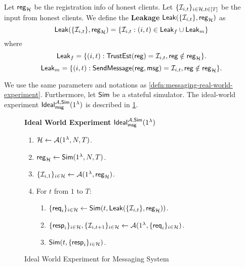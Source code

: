 \begin{definition}
\label{defn:messaging-leakage}
Let $\mathsf{reg}_{\mathcal{H}}$ be the registration info of honest clients. Let $\{\mathcal{I}_{i, t}\}_{i \in \mathcal{H}, t \in [T]}$ be the input from honest clients. We define the \textbf{Leakage} $\mathsf{Leak}(\{\mathcal{I}_{i, t}\}, \mathsf{reg}_{\mathcal{H}})$ as
$$\mathsf{Leak}(\{\mathcal{I}_{i, t}\}, \mathsf{reg}_{\mathcal{H}}) = \{\mathcal{I}_{i, t}: (i, t) \in \mathsf{Leak}_f \cup \mathsf{Leak}_m\}$$
where
$$\mathsf{Leak}_f = \{(i, t): \mathsf{TrustEst}(\mathsf{reg}) = \mathcal{I}_{i, t}, \mathsf{reg} \notin \mathsf{reg}_{\mathcal{H}}\}.$$
$$\mathsf{Leak}_m = \{(i, t): \mathsf{SendMessage}(\mathsf{reg}, \mathsf{msg}) = \mathcal{I}_{i, t}, \mathsf{reg} \notin \mathsf{reg}_{\mathcal{H}}\}.$$
\end{definition}
\begin{definition}
\label{defn:messaging-ideal-world-experiment}
We use the same parameters and notations as \cref{defn:messaging-real-world-experiment}. Furthermore, let $\mathsf{Sim}$ be a stateful simulator. The ideal-world experiment $\mathsf{Ideal}_{\mathsf{msg}}^{\mathcal{A}, \mathsf{Sim}}(1^{\lambda})$ is described in \cref{expr:messaging-ideal-world}.
\begin{figure}[h]
\begin{framed}
\textbf{Ideal World Experiment }$\mathsf{Ideal}_{\mathsf{msg}}^{\mathcal{A}, \mathsf{Sim}}(1^{\lambda})$
\begin{enumerate}
\item $\mathcal{H} \leftarrow \mathcal{A}(1^{\lambda}, N, T)$.
\item $\mathsf{reg}_{\mathcal{H}} \leftarrow \mathsf{Sim}(1^{\lambda}, N, T)$. 
\item $\{\mathcal{I}_{i, 1}\}_{i \in \mathcal{H}} \leftarrow \mathcal{A}(1^{\lambda}, \mathsf{reg}_{\mathcal{H}})$.
\item For $t$ from $1$ to $T$:
    \begin{enumerate}
    \item  $\{\mathsf{req}_i\}_{i \in \mathcal{H}} \leftarrow \mathsf{Sim}(t, \mathsf{Leak}(\{\mathcal{I}_{i, t}\}, \mathsf{reg}_{\mathcal{H}}))$.
    
    \item $\{\mathsf{resp}_i\}_{i \in \mathcal{H}}, \{\mathcal{I}_{i, t + 1}\}_{i \in \mathcal{H}} \leftarrow \mathcal{A}(1^{\lambda}, \{\mathsf{req}_i\}_{i \in \mathcal{H}})$.
    
    \item $\mathsf{Sim}(t, \{\mathsf{resp}_i\}_{i \in \mathcal{H}})$.
    \end{enumerate}
\end{enumerate}
\end{framed}
\caption{Ideal World Experiment for Messaging System}
\label{expr:messaging-ideal-world}
\end{figure}

\end{definition}

